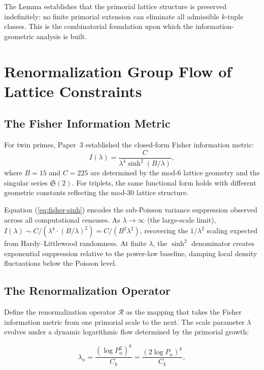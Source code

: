 \documentclass[11pt]{article}
\theoremstyle{remark}
\begin{document}
The Lemma establishes that the primorial lattice structure is preserved
indefinitely: no finite primorial extension can eliminate all admissible
$k$-tuple classes. This is the combinatorial foundation upon which the
information-geometric analysis is built.

\section{Renormalization Group Flow of Lattice Constraints}

\subsection{The Fisher Information Metric}

For twin primes, Paper~3 established the closed-form Fisher information
metric:
\begin{equation}
I(\lambda) = \frac{C}{\lambda^4 \sinh^2(B/\lambda)},
\label{eq:fisher-sinh}
\end{equation}
where $B = 15$ and $C = 225$ are determined by the mod-6 lattice
geometry and the singular series $\mathfrak{S}(2)$. For triplets, the
same functional form holds with different geometric constants reflecting
the mod-30 lattice structure.

Equation (\ref{eq:fisher-sinh}) encodes the sub-Poisson variance
suppression observed across all computational censuses. As $\lambda \to
\infty$ (the large-scale limit), $I(\lambda) \sim C/(\lambda^4 \cdot
(B/\lambda)^2) = C/(B^2 \lambda^2)$, recovering the $1/\lambda^2$
scaling expected from Hardy--Littlewood randomness. At finite $\lambda$,
the $\sinh^2$ denominator creates exponential suppression relative to
the power-law baseline, damping local density fluctuations below the
Poisson level.

\subsection{The Renormalization Operator}

Define the renormalization operator $\mathcal{R}$ as the mapping that
takes the Fisher information metric from one primorial scale to the next.
The scale parameter $\lambda$ evolves under a dynamic logarithmic flow
determined by the primorial growth:

\begin{equation}
\lambda_n = \frac{(\log P_n^2)^k}{C_k} = \frac{(2 \log P_n)^k}{C_k},
\label{eq:lambda-flow}
\end{equation}
\end{document}
